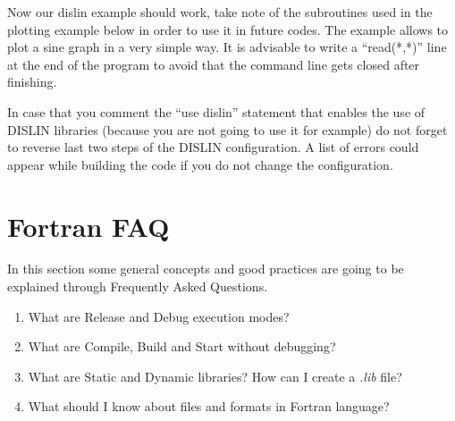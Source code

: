 Now our dislin example should work, take note of the subroutines used in the plotting example below in order to use it in future codes. The example allows to plot a sine graph in a very simple way. It is advisable to write a ``read(*,*)'' line at the end of the program to avoid that the command line gets closed after finishing. \vspace{0.5cm}

 

\begin{IN}
    In case that you comment the ``use dislin'' statement that enables the use of DISLIN libraries (because you are not going to use it for example) do not forget to reverse last two steps of the DISLIN configuration. A list of errors could appear while building the code if you do not change the configuration. 
\end{IN}


%



    \section{Fortran FAQ}

In this section some general concepts and good practices are going to be explained through Frequently Asked Questions.

\begin{enumerate}[nosep]
    \item What are Release and Debug execution modes?
    \item What are Compile, Build and Start without debugging?
    \item What are Static and Dynamic libraries? How can I create a \textit{.lib} file?
    \item What should I know about files and formats in Fortran language?
\end{enumerate}

